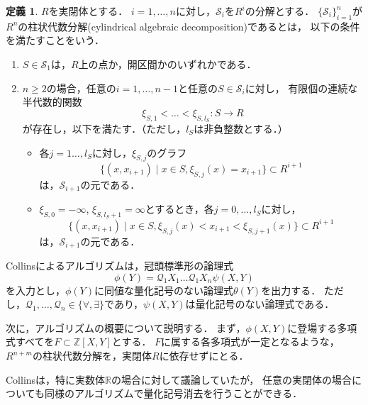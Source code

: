 \documentclass[uplatex, dvipdfmx]{jsarticle}
\newcommand{\Qua}{\mathcal{Q}}
\newcommand{\map}[3]{{#1}\colon{#2}\rightarrow{#3}}
\theoremstyle{definition}
\newtheorem*{definition*}{定義}
\begin{document}
\begin{definition*}
    $R$を実閉体とする．
    $i=1, \dots, n$に対し，$\mathcal{S}_i$を$R^i$の分解とする．
    $\{\mathcal{S}_i\}_{i=1}^n$が$R^n$の柱状代数分解(cylindrical algebraic decomposition)であるとは，
    以下の条件を満たすことをいう．
    \begin{enumerate}
         \item $S \in \mathcal{S}_1$は，$R$上の点か，開区間かのいずれかである．
         \item $n\geq 2$の場合，任意の$i=1, \dots, n-1$と任意の$S \in \mathcal{S}_i$に対し，
         有限個の連続な半代数的関数
         \begin{equation}
              \map{\xi_{S,1}< \dots <\xi_{S,l_S}}{S}{R}
         \end{equation}
         が存在し，以下を満たす．（ただし，$l_S$は非負整数とする．）
         \begin{itemize}
              \item 各$j=1 \dots, l_S$に対し，$\xi_{S,j}$のグラフ
              \begin{equation}
                   \{(x,x_{i+1}) \mid x \in S, \xi_{S,j}(x)=x_{i+1} \} \subset R^{i+1}
              \end{equation}
              は，$\mathcal{S}_{i+1}$の元である．
              \item $\xi_{S,0}=-\infty$, $\xi_{S,l_S+1}=\infty$とするとき，各$j=0, \dots, l_S$に対し，\label{cad_condition1}
              \begin{equation}
                   \{(x,x_{i+1}) \mid x \in S, \xi_{S,j}(x)<x_{i+1}<\xi_{S,j+1}(x) \} \subset R^{i+1}
              \end{equation}
              は，$\mathcal{S}_{i+1}$の元である．
         \end{itemize}
    \end{enumerate}

\end{definition*}

Collinsによるアルゴリズムは，冠頭標準形の論理式
\begin{equation}
    \phi(Y) = \Qua_1 X_1 \dots \Qua_1 X_n \psi(X,Y)
\end{equation}
を入力とし，$\phi(Y)$に同値な量化記号のない論理式$\theta(Y)$を出力する．
ただし，$\Qua_1, \dots, \Qua_n \in \{\forall, \exists\}$であり，$\psi(X,Y)$は量化記号のない論理式である．

次に，アルゴリズムの概要について説明する．
まず，$\phi(X,Y)$に登場する多項式すべてを$F \subset \mathbb{Z}[X, Y]$とする．
$F$に属する各多項式が一定となるような，$R^{n+m}$の柱状代数分解を，実閉体$R$に依存せずにとる．

Collinsは，特に実数体$\mathbb{R}$の場合に対して議論していたが，
任意の実閉体の場合についても同様のアルゴリズムで量化記号消去を行うことができる．
\end{document}
